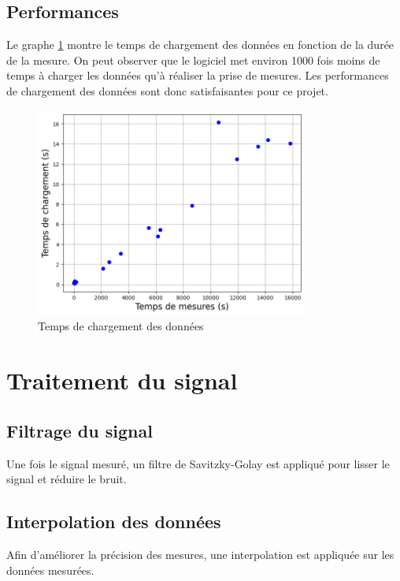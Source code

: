 \subsection{Performances}

Le graphe \ref{fig:LoadingPerformance} montre le temps de chargement des données en fonction de la durée de la mesure.  
On peut observer que le logiciel met environ 1000 fois moins de temps à charger les données qu'à réaliser la prise de mesures.  
Les performances de chargement des données sont donc satisfaisantes pour ce projet.

\begin{figure}[H]
    \centering
    \includegraphics[width=0.8\textwidth]{assets/figures/LoadingPerformance.png}
    \caption{Temps de chargement des données}
    \label{fig:LoadingPerformance}
\end{figure}

\section{Traitement du signal}

\subsection{Filtrage du signal}

Une fois le signal mesuré, un filtre de Savitzky-Golay est appliqué pour lisser le signal et réduire le bruit.

\subsection{Interpolation des données}

Afin d'améliorer la précision des mesures, une interpolation est appliquée sur les données mesurées.

